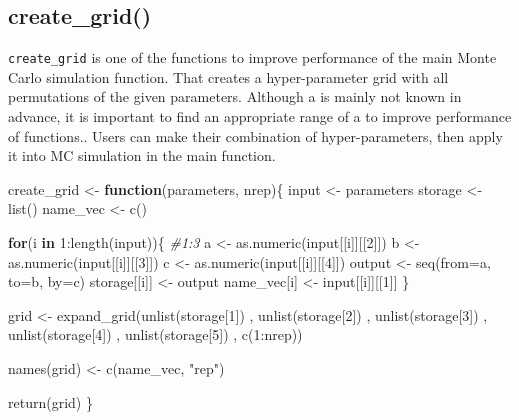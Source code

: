 \documentclass[11pt,a4paper]{article}
\newenvironment{Shaded}{\begin{snugshade}}{\end{snugshade}}
\newcommand{\AttributeTok}[1]{\textcolor[rgb]{0.77,0.63,0.00}{#1}}
\newcommand{\CommentTok}[1]{\textcolor[rgb]{0.56,0.35,0.01}{\textit{#1}}}
\newcommand{\ControlFlowTok}[1]{\textcolor[rgb]{0.13,0.29,0.53}{\textbf{#1}}}
\newcommand{\DecValTok}[1]{\textcolor[rgb]{0.00,0.00,0.81}{#1}}
\newcommand{\FunctionTok}[1]{\textcolor[rgb]{0.00,0.00,0.00}{#1}}
\newcommand{\NormalTok}[1]{#1}
\newcommand{\OtherTok}[1]{\textcolor[rgb]{0.56,0.35,0.01}{#1}}
\newcommand{\SpecialCharTok}[1]{\textcolor[rgb]{0.00,0.00,0.00}{#1}}
\newcommand{\StringTok}[1]{\textcolor[rgb]{0.31,0.60,0.02}{#1}}
\begin{document}
\hypertarget{create_grid}{%
\subsection{create\_grid()}\label{create_grid}}

\texttt{create\_grid} is one of the functions to improve performance of
the main Monte Carlo simulation function. That creates a hyper-parameter
grid with all permutations of the given parameters. Although a is mainly
not known in advance, it is important to find an appropriate range of a
to improve performance of functions.\autocite{Rana_2022}. Users can make
their combination of hyper-parameters, then apply it into MC simulation
in the main function.

\begin{Shaded}
\begin{Highlighting}[]
\NormalTok{create\_grid }\OtherTok{\textless{}{-}} \ControlFlowTok{function}\NormalTok{(parameters, nrep)\{}
\NormalTok{  input }\OtherTok{\textless{}{-}}\NormalTok{ parameters}
\NormalTok{  storage }\OtherTok{\textless{}{-}} \FunctionTok{list}\NormalTok{()}
\NormalTok{  name\_vec }\OtherTok{\textless{}{-}} \FunctionTok{c}\NormalTok{()}
  
  \ControlFlowTok{for}\NormalTok{(i }\ControlFlowTok{in} \DecValTok{1}\SpecialCharTok{:}\FunctionTok{length}\NormalTok{(input))\{ }\CommentTok{\#1:3}
\NormalTok{    a }\OtherTok{\textless{}{-}} \FunctionTok{as.numeric}\NormalTok{(input[[i]][[}\DecValTok{2}\NormalTok{]])}
\NormalTok{    b }\OtherTok{\textless{}{-}} \FunctionTok{as.numeric}\NormalTok{(input[[i]][[}\DecValTok{3}\NormalTok{]])}
\NormalTok{    c }\OtherTok{\textless{}{-}} \FunctionTok{as.numeric}\NormalTok{(input[[i]][[}\DecValTok{4}\NormalTok{]])}
\NormalTok{    output }\OtherTok{\textless{}{-}} \FunctionTok{seq}\NormalTok{(}\AttributeTok{from=}\NormalTok{a, }\AttributeTok{to=}\NormalTok{b, }\AttributeTok{by=}\NormalTok{c)}
\NormalTok{    storage[[i]] }\OtherTok{\textless{}{-}}\NormalTok{  output}
\NormalTok{    name\_vec[i] }\OtherTok{\textless{}{-}}\NormalTok{ input[[i]][[}\DecValTok{1}\NormalTok{]]}
\NormalTok{  \}}
  
\NormalTok{  grid }\OtherTok{\textless{}{-}} \FunctionTok{expand\_grid}\NormalTok{(}\FunctionTok{unlist}\NormalTok{(storage[}\DecValTok{1}\NormalTok{])}
\NormalTok{                      , }\FunctionTok{unlist}\NormalTok{(storage[}\DecValTok{2}\NormalTok{])}
\NormalTok{                      , }\FunctionTok{unlist}\NormalTok{(storage[}\DecValTok{3}\NormalTok{])}
\NormalTok{                      , }\FunctionTok{unlist}\NormalTok{(storage[}\DecValTok{4}\NormalTok{])}
\NormalTok{                      , }\FunctionTok{unlist}\NormalTok{(storage[}\DecValTok{5}\NormalTok{])}
\NormalTok{                      , }\FunctionTok{c}\NormalTok{(}\DecValTok{1}\SpecialCharTok{:}\NormalTok{nrep))}
  
  \FunctionTok{names}\NormalTok{(grid) }\OtherTok{\textless{}{-}} \FunctionTok{c}\NormalTok{(name\_vec, }\StringTok{"rep"}\NormalTok{)}
  
  \FunctionTok{return}\NormalTok{(grid)}
\NormalTok{\}}
\end{Highlighting}
\end{Shaded}
\end{document}
